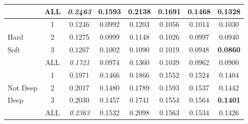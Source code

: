 \begin{table}[!tbp]
\begin{tabular}{||l|c|c|c|c|c|c|c||}
 & ALL & \color[HTML]{8E0000} \textit{0.2463} & 0.1593 & 0.2138 & 0.1691 & 0.1468 & 0.1328 \\
\hline
\hline
 & 1 & 0.1246 & 0.0992 & 0.1203 & 0.1056 & 0.1014 & 0.1030 \\
Hard & 2 & 0.1275 & 0.0999 & 0.1148 & 0.1026 & 0.0997 & 0.0940 \\
Soft & 3 & 0.1267 & 0.1002 & 0.1090 & 0.1019 & 0.0948 & \color[HTML]{326B00} \textbf{0.0860} \\
 & ALL & \color[HTML]{8E0000} \textit{0.1721} & 0.0974 & 0.1360 & 0.1039 & 0.0962 & 0.0900 \\
\hline
\hline
 & 1 & 0.1971 & 0.1466 & 0.1866 & 0.1552 & 0.1524 & 0.1404 \\
Not Deep & 2 & 0.2017 & 0.1480 & 0.1789 & 0.1593 & 0.1537 & 0.1442 \\
Deep & 3 & 0.2030 & 0.1457 & 0.1741 & 0.1554 & 0.1564 & \color[HTML]{326B00}\textbf{0.1401} \\
 & ALL & \color[HTML]{8E0000} \textit{0.2363} & 0.1532 & 0.2098 & 0.1563 & 0.1534 & 0.1426 \\
\hline
\hline
\end{tabular}
\egroup
\end{table}


